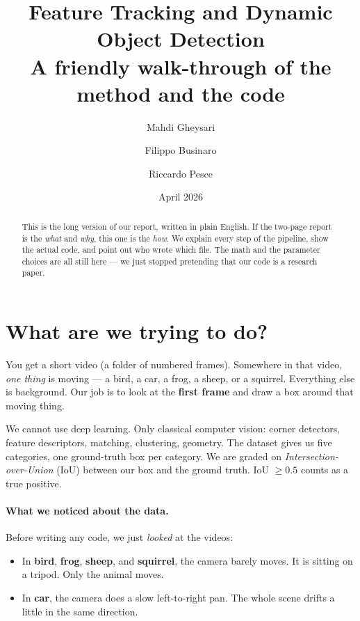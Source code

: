 \documentclass[11pt,a4paper]{article}
\title{\vspace{-1.5em}Feature Tracking and Dynamic Object Detection \\
\large A friendly walk-through of the method and the code}
\author{Mahdi Gheysari \and Filippo Businaro \and Riccardo Pesce}
\date{April 2026}
\begin{document}
\maketitle
\vspace{-2em}

\begin{abstract}
This is the long version of our report, written in plain English.
If the two-page report is the \emph{what} and \emph{why}, this one is
the \emph{how}. We explain every step of the pipeline, show the
actual code, and point out who wrote which file. The math and the
parameter choices are all still here --- we just stopped pretending
that our code is a research paper.
\end{abstract}

\tableofcontents
\vspace{1em}

\section{What are we trying to do?}

You get a short video (a folder of numbered frames). Somewhere in
that video, \emph{one thing} is moving --- a bird, a car, a frog, a
sheep, or a squirrel. Everything else is background. Our job is to
look at the \textbf{first frame} and draw a box around that moving
thing.

We cannot use deep learning. Only classical computer vision: corner
detectors, feature descriptors, matching, clustering, geometry. The
dataset gives us five categories, one ground-truth box per category.
We are graded on \emph{Intersection-over-Union} (IoU) between our
box and the ground truth. IoU $\geq 0.5$ counts as a true positive.

\paragraph{What we noticed about the data.} Before writing any code,
we just \emph{looked} at the videos:

\begin{itemize}\itemsep2pt
\item In \textbf{bird}, \textbf{frog}, \textbf{sheep}, and
  \textbf{squirrel}, the camera barely moves. It is sitting on a
  tripod. Only the animal moves.
\item In \textbf{car}, the camera does a slow left-to-right pan.
  The whole scene drifts a little in the same direction.
\end{itemize}
\end{document}
